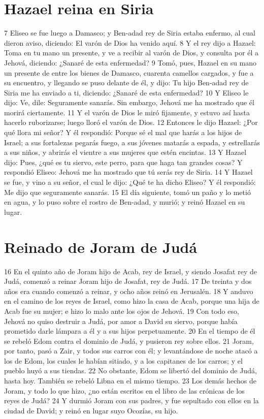 \section*{Hazael reina en Siria}

7 Eliseo se fue luego a Damasco; y Ben-adad rey de Siria estaba enfermo, al cual dieron aviso, diciendo: El varón de Dios ha venido aquí.
8 Y el rey dijo a Hazael: Toma en tu mano un presente, y ve a recibir al varón de Dios, y consulta por él a Jehová, diciendo: ¿Sanaré de esta enfermedad?
9 Tomó, pues, Hazael en su mano un presente de entre los bienes de Damasco, cuarenta camellos cargados, y fue a su encuentro, y llegando se puso delante de él, y dijo: Tu hijo Ben-adad rey de Siria me ha enviado a ti, diciendo: ¿Sanaré de esta enfermedad?
10 Y Eliseo le dijo: Ve, dile: Seguramente sanarás. Sin embargo, Jehová me ha mostrado que él morirá ciertamente.
11 Y el varón de Dios le miró fijamente, y estuvo así hasta hacerlo ruborizarse; luego lloró el varón de Dios.
12 Entonces le dijo Hazael: ¿Por qué llora mi señor? Y él respondió: Porque sé el mal que harás a los hijos de Israel; a sus fortalezas pegarás fuego, a sus jóvenes matarás a espada, y estrellarás a sus niños, y abrirás el vientre a sus mujeres que estén encintas.
13 Y Hazael dijo: Pues, ¿qué es tu siervo, este perro, para que haga tan grandes cosas? Y respondió Eliseo: Jehová me ha mostrado que tú serás rey de Siria. 
14 Y Hazael se fue, y vino a su señor, el cual le dijo: ¿Qué te ha dicho Eliseo? Y él respondió: Me dijo que seguramente sanarás.
15 El día siguiente, tomó un paño y lo metió en agua, y lo puso sobre el rostro de Ben-adad, y murió; y reinó Hazael en su lugar.
\section*{Reinado de Joram de Judá}

 
16 En el quinto año de Joram hijo de Acab, rey de Israel, y siendo Josafat rey de Judá, comenzó a reinar Joram hijo de Josafat, rey de Judá.
17 De treinta y dos años era cuando comenzó a reinar, y ocho años reinó en Jerusalén.
18 Y anduvo en el camino de los reyes de Israel, como hizo la casa de Acab, porque una hija de Acab fue su mujer; e hizo lo malo ante los ojos de Jehová.
19 Con todo eso, Jehová no quiso destruir a Judá, por amor a David su siervo, porque había prometido darle lámpara a él y a sus hijos perpetuamente. 
20 En el tiempo de él se rebeló Edom contra el dominio de Judá, y pusieron rey sobre ellos.
21 Joram, por tanto, pasó a Zair, y todos sus carros con él; y levantándose de noche atacó a los de Edom, los cuales le habían sitiado, y a los capitanes de los carros; y el pueblo huyó a sus tiendas.
22 No obstante, Edom se libertó del dominio de Judá, hasta hoy. También se rebeló Libna en el mismo tiempo.
23 Los demás hechos de Joram, y todo lo que hizo, ¿no están escritos en el libro de las crónicas de los reyes de Judá?
24 Y durmió Joram con sus padres, y fue sepultado con ellos en la ciudad de David; y reinó en lugar suyo Ocozías, su hijo.
